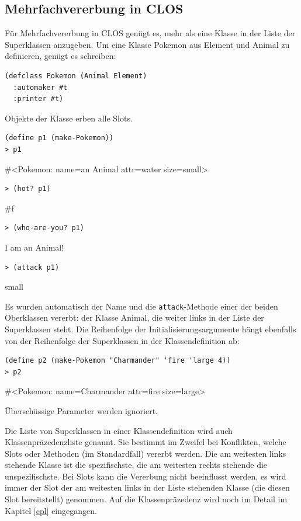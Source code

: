 \subsection{Mehrfachvererbung in CLOS}
Für Mehrfachvererbung in CLOS genügt es, mehr als eine Klasse in der Liste der Superklassen anzugeben. Um eine Klasse Pokemon aus Element und Animal zu definieren, genügt es schreiben:

\begin{lstlisting}
(defclass Pokemon (Animal Element)
  :automaker #t
  :printer #t)
\end{lstlisting}

Objekte der Klasse erben alle Slots.

\begin{lstlisting}
(define p1 (make-Pokemon))
> p1
\end{lstlisting}
{\routput \#<Pokemon: name={\qq}an Animal{\qq} attr=water size=small>}

\begin{lstlisting}
> (hot? p1)
\end{lstlisting}
{\routput \#f}

\begin{lstlisting}
> (who-are-you? p1)
\end{lstlisting}
{\routput {\qq}I am an Animal!\qq}

\begin{lstlisting}
> (attack p1)
\end{lstlisting}
{\rsymbol small}

Es wurden automatisch der Name und die \texttt{attack}-Methode einer der beiden Oberklassen vererbt: der Klasse Animal, die weiter links in der Liste der Superklassen steht. Die Reihenfolge der Initialisierungsargumente hängt ebenfalls von der Reihenfolge der Superklassen in der Klassendefinition ab:

\begin{lstlisting}
(define p2 (make-Pokemon "Charmander" 'fire 'large 4))
> p2
\end{lstlisting}
{\routput \#<Pokemon: name={\qq}Charmander{\qq} attr=fire size=large>}

Überschüssige Parameter werden ignoriert.

Die Liste von Superklassen in einer Klassendefinition wird auch Klassenpräzedenzliste genannt. Sie bestimmt im Zweifel bei Konflikten, welche Slots oder Methoden (im Standardfall) vererbt werden. Die am weitesten links stehende Klasse ist die spezifischste, die am weitesten rechts stehende die unspezifischste. Bei Slots kann die Vererbung nicht beeinflusst werden, es wird immer der Slot der am weitesten links in der Liste stehenden Klasse (die diesen Slot bereitstellt) genommen. Auf die Klassenpräzedenz wird noch im Detail im Kapitel \ref{cpl} eingegangen.

